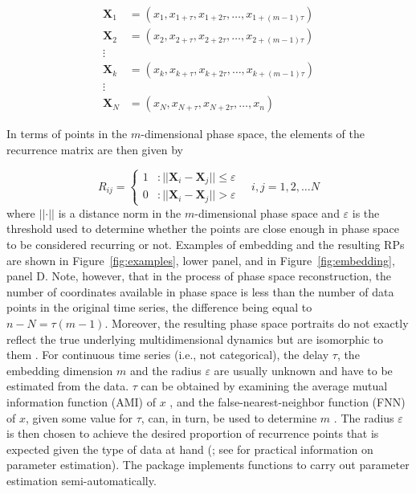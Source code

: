 \begin{align}
    \mathbf{X}_1 &= (x_1, x_{1+\tau}, x_{1+2\tau}, \ldots, x_{1+(m-1)\tau}) \nonumber\\
    \mathbf{X}_2 &= (x_2, x_{2+\tau}, x_{2+2\tau}, \ldots, x_{2+(m-1)\tau}) \nonumber\\
    \vdots& \\
    \mathbf{X}_k &= (x_k, x_{k+\tau}, x_{k+2\tau}, \ldots, x_{k+(m-1)\tau}) \nonumber\\
    \vdots&  \nonumber\\
    \mathbf{X}_N &= (x_N, x_{N+\tau}, x_{N+2\tau}, \ldots, x_{n}) \nonumber
\end{align}

\newpage

In terms of points in the $m$-dimensional phase space, the elements of the recurrence matrix are then given by

\begin{equation}\label{eq:Rij}
    R_{ij} = \left\{
  \begin{array}{lr}
    1 & : \vert\vert \mathbf{X}_i - \mathbf{X}_j \vert\vert \leq \varepsilon \\
    0 & : \vert\vert \mathbf{X}_i - \mathbf{X}_j \vert\vert > \varepsilon
  \end{array}
\right.
\quad
i,j = 1,2, \ldots N
\end{equation} where $\vert\vert\cdot\vert\vert$ is a distance norm in the $m$-dimensional phase space and $\varepsilon$ is the threshold used to determine whether the points are close enough in phase space to be considered recurring or not. Examples of embedding and the resulting RPs are shown in Figure~\ref{fig:examples}, lower panel, and in Figure~\ref{fig:embedding}, panel D.
Note, however, that in the process of phase space reconstruction, the number of coordinates available in phase space is less than the number of data points in the original time series, the difference being equal to $n-N = \tau (m-1)$. Moreover, the resulting phase space portraits do not exactly reflect the true underlying multidimensional dynamics but are isomorphic to them \citep{garland2016exploring}.
For continuous time series (i.e., not categorical), the delay $\tau$, the embedding dimension $m$ and the radius $\varepsilon$ are usually unknown and have to be estimated from the data. $\tau$ can be obtained by examining the average mutual information function (AMI) of $x$ \citep{fraser1986independent}, and the false-nearest-neighbor function (FNN) of $x$, given some value for $\tau$, can, in turn, be used to determine $m$ \citep{kennel1992determining}. The radius $\varepsilon$  is then chosen to achieve the desired proportion of recurrence points that is expected given the type of data at hand (\cite{webber2005recurrence}; see \cite{wallot2018calculation} for practical information on parameter estimation). The  package implements functions to carry out parameter estimation semi-automatically.

